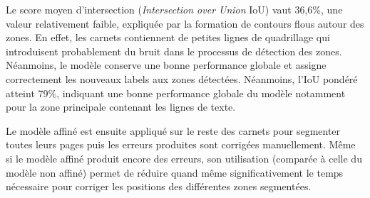 \documentclass[final, fra]{anthology-ch}     %
\begin{document}
Le score moyen d’intersection (\textit{Intersection over Union} IoU) vaut 36,6\%, une valeur relativement faible, expliquée par la formation de contours flous autour des zones. En effet, les carnets contiennent de petites lignes de quadrillage qui introduisent probablement du bruit dans le processus de détection des zones. Néanmoins, le modèle conserve une bonne performance globale et assigne correctement les nouveaux labels aux zones détectées. Néanmoins, l’IoU pondéré atteint 79\%, indiquant une bonne performance globale du modèle notamment pour la zone principale contenant les lignes de texte. %

Le modèle affiné est ensuite appliqué sur le reste des carnets pour segmenter toutes leurs pages puis les erreurs produites sont corrigées manuellement. Même si le modèle affiné produit encore des erreurs, son utilisation (comparée à celle du modèle non affiné) permet de réduire quand même significativement le temps nécessaire pour corriger les positions des différentes zones segmentées.
\end{document}
